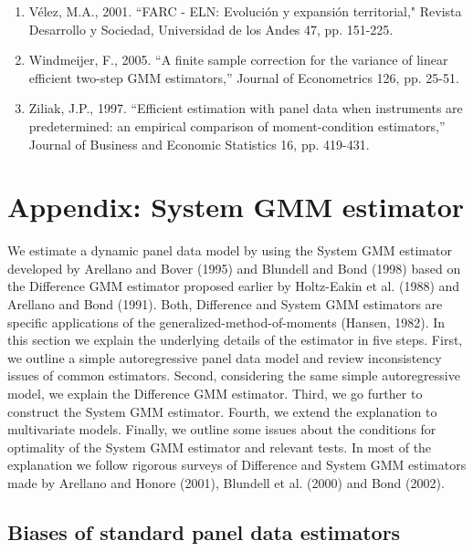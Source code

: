 \documentclass[12pt,a4paper,english]{article}%
\begin{document}
\begin{enumerate}
\item V\'{e}lez, M.A., 2001. ``FARC - ELN: Evoluci\'{o}n y expansi\'{o}n territorial," Revista Desarrollo y Sociedad, Universidad de los Andes 47, pp. 151-225.

\item Windmeijer, F., 2005. ``A finite sample correction for the variance of linear efficient two-step GMM estimators,'' Journal of Econometrics 126, pp. 25-51.

\item  Ziliak, J.P., 1997. ``Efficient estimation with panel data when instruments are predetermined: an empirical comparison of moment-condition estimators,'' Journal of Business and Economic Statistics 16, pp. 419-431.

\end{enumerate}

\newpage
\section*{Appendix: System GMM estimator}
\label{systemGMM}

We estimate a dynamic panel data model by using the System GMM estimator developed by Arellano and Bover (1995) and Blundell and Bond (1998) based on the Difference GMM estimator proposed earlier by Holtz-Eakin et al. (1988) and Arellano and Bond (1991). Both, Difference and System GMM estimators are specific applications of the generalized-method-of-moments (Hansen, 1982). In this section we explain the underlying details of the estimator in five steps. First, we outline a simple autoregressive panel data model and review inconsistency issues of common estimators. Second, considering the same simple autoregressive model, we explain the Difference GMM estimator. Third, we go further to construct the System GMM estimator. Fourth, we extend the explanation to multivariate models. Finally, we outline some issues about the conditions for optimality of the System GMM estimator and relevant tests. In most of the explanation we follow rigorous surveys of Difference and System GMM estimators made by Arellano and Honore (2001), Blundell et al. (2000) and Bond (2002).

\subsection*{Biases of standard panel data estimators}
\end{document}
